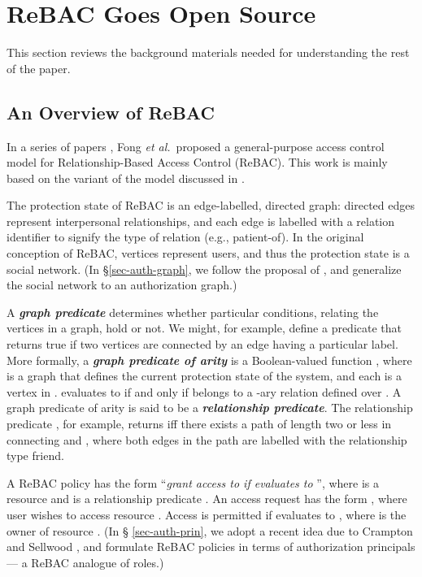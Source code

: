 \documentclass{acm_proc_article-sp}
\newcommand{\Dfn}[1]{\textbf{\emph{#1}}}
\begin{document}
\section{R\MakeLowercase{e}BAC Goes Open Source}

This section reviews the background materials needed for understanding
the rest of the paper.

\subsection{An Overview of ReBAC}

In a series of papers \cite{Fong:2011, Fong-Siahaan:2011,
  Bruns-etal:2012}, Fong \emph{et al.}~proposed a general-purpose
access control model for Relationship-Based Access Control (ReBAC).
This work is mainly based on the variant of the model discussed in
\cite{Bruns-etal:2012}.

The protection state of ReBAC is an edge-labelled, directed graph:
directed edges represent interpersonal relationships, and each edge is
labelled with a relation identifier to signify the type of relation
(e.g., \textsf{patient-of}).  In the original conception of ReBAC,
vertices represent users, and thus the protection state is a social
network.  (In \S \ref{sec-auth-graph}, we follow the proposal of
\cite{Crampton-Sellwood:2014}, and generalize the social network to an
authorization graph.)

A \Dfn{graph predicate} determines whether particular conditions,
relating the vertices in a graph, hold or not.  We might, for example,
define a predicate that returns true if two vertices are connected by
an edge having a particular label.  More formally, a \Dfn{graph
  predicate of arity } is a Boolean-valued function , where  is a graph that defines the current
protection state of the system, and each  is a vertex in .
 evaluates to  if and only if 
belongs to a -ary relation defined over . A graph predicate
of arity  is said to be a \Dfn{relationship predicate}.
The relationship predicate ,
for example, returns  iff there exists a path of length two or less
in  connecting  and , where both
edges in the path are labelled with the relationship type \textsf{friend}.





A ReBAC policy has the form ``\emph{grant access to  if
   evaluates to }'', where  is a resource and
 is a relationship predicate \cite{Bruns-etal:2012}.  An
access request has the form , where user  wishes to access
resource .  Access is permitted if  evaluates
to , where  is the owner of resource .  (In \S
\ref{sec-auth-prin}, we adopt a recent idea due to
Crampton and Sellwood \cite{Crampton-Sellwood:2014},
and formulate ReBAC policies in terms of authorization principals
--- a ReBAC analogue of roles.)
\end{document}
